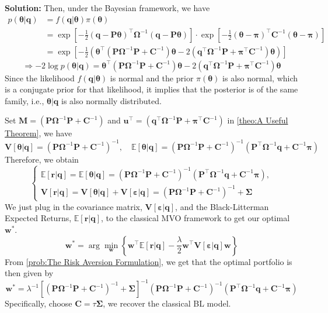 \documentclass[13pt]{article}
\theoremstyle{definition}
\newenvironment{solution}
{\color{C2}\begin{framed}\begingroup\textbf{Solution:} }
  {\endgroup\end{framed}}
\theoremstyle{remark}
\newcommand{\EE}{\mathbb{E}}
\newcommand{\VV}{\mathbb{\mathbf{V}}}
\begin{document}
\begin{solution}
Then, under the Bayesian framework, we have
\begin{align*}
    p(\bm{\theta}|\bm{q}) &=f(\bm{q}|\bm{\theta})\pi(\bm{\theta})\\
    &= \exp\left[-\frac{1}{2}(\bm{q}-\mathbf{P}\bm{\theta})^\top\mathbf{\Omega}^{-1}(\bm{q}-\mathbf{P}\bm{\theta})\right]\cdot \exp\left[-\frac{1}{2}(\bm{\theta}-\bm{\pi})^\top\mathbf{C}^{-1}(\bm{\theta}-\bm{\pi})\right]\\
    &=\exp\left[-\frac{1}{2}\left(\bm{\theta}^\top (\mathbf{P}\mathbf{\Omega}^{-1}\mathbf{P}+\mathbf{C}^{-1})\bm{\theta}-2(\bm{q}^\top\mathbf{\Omega}^{-1}\mathbf{P}+\bm{\pi}^\top \mathbf{C}^{-1} )\bm{\theta}\right)\right]
\end{align*}
\[
\Longrightarrow -2\log p(\bm{\theta}|\bm{q}) = \bm{\theta}^\top (\mathbf{P}\mathbf{\Omega}^{-1}\mathbf{P}+\mathbf{C}^{-1})\bm{\theta}-2(\bm{q}^\top\mathbf{\Omega}^{-1}\mathbf{P}+\bm{\pi}^\top \mathbf{C}^{-1} )\bm{\theta}
\]
Since the likelihood $f(\bm{q}|\bm{\theta})$ is normal and the prior $\pi(\bm{\theta})$ is also normal, which is a conjugate prior for that likelihood, it implies that the posterior is of the same family, i.e., $\bm{\theta}|\bm{q}$ is also normally distributed.

Set $\mathbf{M}=(\mathbf{P}\mathbf{\Omega}^{-1}\mathbf{P}+\mathbf{C}^{-1})$ and $\bm{u}^\top=(\bm{q}^\top\mathbf{\Omega}^{-1}\mathbf{P}+\bm{\pi}^\top \mathbf{C}^{-1} )$ in \cref{theo:A Useful Theorem}, we have
\[
\VV[\bm{\theta}|\bm{q}]=(\mathbf{P}\mathbf{\Omega}^{-1}\mathbf{P}+\mathbf{C}^{-1})^{-1}, \quad \EE[\bm{\theta}|\bm{q}]=(\mathbf{P}\mathbf{\Omega}^{-1}\mathbf{P}+\mathbf{C}^{-1})^{-1}(\mathbf{P}^\top \mathbf{\Omega}^{-1}\bm{q}+\mathbf{C}^{-1}\bm{\pi}  )
\]
Therefore, we obtain
\[\begin{cases}
\EE[\bm{r}|\bm{q}] = \EE[\bm{\theta}|\bm{q}] =  (\mathbf{P}\mathbf{\Omega}^{-1}\mathbf{P}+\mathbf{C}^{-1})^{-1}(\mathbf{P}^\top \mathbf{\Omega}^{-1}\bm{q}+\mathbf{C}^{-1}\bm{\pi}  ), \\
\VV[\bm{r}|\bm{q}] = \VV[\bm{\theta}|\bm{q}] +\VV[\bm{\varepsilon}|\bm{q}] =   (\mathbf{P}\mathbf{\Omega}^{-1}\mathbf{P}+\mathbf{C}^{-1})^{-1}+\mathbf{\Sigma}
\end{cases}
\]
We just plug in the covariance matrix, $\VV[\bm{\varepsilon}|\bm{q}]$, and the Black-Litterman Expected Returns, $\EE[\bm{r}|\bm{q}]$, to the classical MVO framework to get our optimal $\bm{w}^*$.
$$\bm{w}^*=\arg
\min_{\bm{w}}\left\{\bm{w}^\top \EE[\bm{r}|\bm{q}]-\frac{\lambda}{2}\bm{w}^\top \VV[\bm{\varepsilon}|\bm{q}]\bm{w} \right\}
$$
From \cref{prob:The Risk Aversion Formulation}, we get that the optimal portfolio is then given by
$$
\bm{w}^*=\lambda^{-1}\left[(\mathbf{P}\mathbf{\Omega}^{-1}\mathbf{P}+\mathbf{C}^{-1})^{-1}+\mathbf{\Sigma}\right]^{-1} (\mathbf{P}\mathbf{\Omega}^{-1}\mathbf{P}+\mathbf{C}^{-1})^{-1}(\mathbf{P}^\top \mathbf{\Omega}^{-1}\bm{q}+\mathbf{C}^{-1}\bm{\pi}  ) 
$$
Specifically, choose $\mathbf{C}=\tau\mathbf{\Sigma}$, we recover the classical BL model.
\end{solution}
\end{document}
